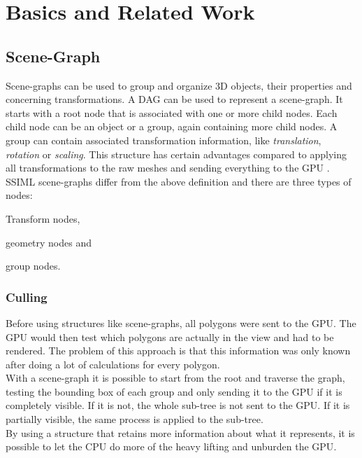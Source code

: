 
\section{Basics and Related Work}
\label{basics-and-related-work}


\subsection{Scene-Graph}\label{scene-graph}

Scene-graphs can be used to group and organize \gls{3D} objects, their properties and
concerning transformations. A \gls{DAG} can be used to represent a scene-graph.
It starts with a root node that is associated with one or more child nodes. Each
child node can be an object or a group, again containing more child nodes. A group can
contain associated transformation information, like \emph{translation},
\emph{rotation} or \emph{scaling}. This structure has certain advantages
compared to applying all transformations to the raw meshes and sending
everything to the \gls{GPU} \cite{realityprime}. \gls{SSIML} scene-graphs differ from the
above definition and there are three types of nodes:

\begin{itemize*}
  \item Transform nodes,
  \item geometry nodes and
  \item group nodes.
\end{itemize*}

\subsubsection{Culling}\label{culling}

Before using structures like scene-graphs, all polygons were sent to
the \gls{GPU}. The \gls{GPU} would then test which polygons are actually in the
view and had to be rendered. The problem of this approach is
that this information was only known after doing a lot of calculations
for every polygon.\\
With a scene-graph it is possible to start from the root and traverse the
graph, testing the bounding box of each group and only sending it to the
\gls{GPU} if it is completely visible. If it is not, the whole sub-tree is not
sent to the \gls{GPU}. If it is partially visible, the same process is applied
to the sub-tree.\\
By using a structure that retains more information about what it
represents, it is possible to let the CPU do more of the heavy
lifting and unburden the \gls{GPU}.

